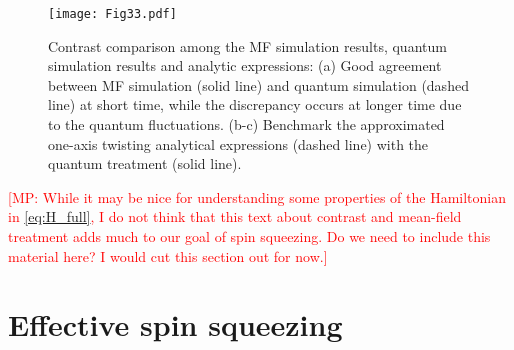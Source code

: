 \documentclass[aps,notitlepage,nofootinbib,11pt]{revtex4-1}
\newcommand{\1}{\hat{\mathds{1}}}
\newcommand{\note}[1]{\textcolor{red}{#1}}
\begin{document}
\begin{figure}
\centering
\texttt{[image: Fig33.pdf]}
\caption{Contrast comparison among the MF simulation results, quantum simulation results and analytic expressions:
(a) Good agreement between MF simulation (solid line) and quantum simulation (dashed line) at short time,
while  the discrepancy occurs at longer time due to the quantum fluctuations.
(b-c) Benchmark the approximated one-axis twisting analytical expressions (dashed line) with the quantum treatment (solid line).
}
\label{fig:EffectiveSqueezing}
\end{figure}

\note{[MP: While it may be nice for understanding some properties of
  the Hamiltonian in \eqref{eq:H_full}, I do not think that this text
  about contrast and mean-field treatment adds much to our goal of
  spin squeezing.  Do we need to include this material here?  I would
  cut this section out for now.]}


\section{Effective spin squeezing}
\label{sec:OAT}
\end{document}
